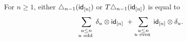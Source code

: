 \begin{lemma}
	For $n \geq 1$, either $\triangle_{n-1}(\mathsf{id}_{[n]})$ or $T \triangle_{n-1}(\mathsf{id}_{[n]})$ is equal to
	\[
	\sum_{\substack{u \leq n \\ u \text{ odd }}} \delta_u \otimes \mathsf{id}_{[n]} \ + \sum_{\substack{u \leq n \\ u \text{ even }}} \mathsf{id}_{[n]} \otimes \delta_u.
	\]
\end{lemma}

